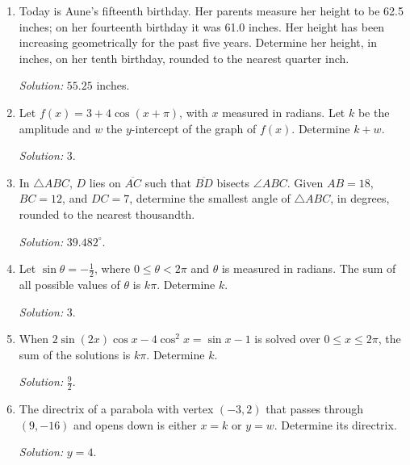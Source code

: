 \documentclass[11pt]{article}
\begin{document}
\begin{enumerate}[label=\textbf{\arabic*.}]
\item Today is Aune's fifteenth birthday. Her parents measure her height to be 62.5 inches; on her fourteenth birthday it was 61.0 inches. Her height has been increasing geometrically for the past five years. Determine her height, in inches, on her tenth birthday, rounded to the nearest quarter inch.\par\textit{Solution: }$55.25$ inches.

\item Let $f(x)=3+4\cos(x+\pi)$, with $x$ measured in radians. Let $k$ be the amplitude and $w$ the $y$-intercept of the graph of $f(x)$. Determine $k+w$.\par\textit{Solution: }$3$.

\item In $\triangle ABC$, $D$ lies on $\overline{AC}$ such that $\overline{BD}$ bisects $\angle ABC$. Given $AB=18$, $BC=12$, and $DC=7$, determine the smallest angle of $\triangle ABC$, in degrees, rounded to the nearest thousandth.\par\textit{Solution: }$39.482^\circ$.

\item Let $\sin\theta=-\frac12$, where $0\leq\theta<2\pi$ and $\theta$ is measured in radians. The sum of all possible values of $\theta$ is $k\pi$. Determine $k$.\par\textit{Solution: }$3$.

\item When $2\sin(2x)\cos x-4\cos^2x=\sin x-1$ is solved over $0\leq x\leq2\pi$, the sum of the solutions is $k\pi$. Determine $k$.\par\textit{Solution: }$\frac92$.

\item The directrix of a parabola with vertex $(-3,2)$ that passes through $(9,-16)$ and opens down is either $x=k$ or $y=w$. Determine its directrix.\par\textit{Solution: }$y=4$.
\end{enumerate}
\end{document}
